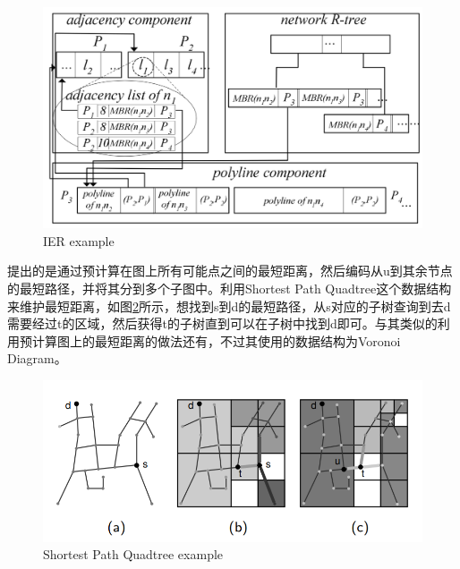 \documentclass{ML}
\begin{document}
\begin{figure}
	\centering
	\includegraphics[width=0.6\linewidth]{media/IER}
	\caption{IER example}
	\label{fig:ier}
\end{figure}

\cite{DisBrw}提出的是通过预计算在图上所有可能点之间的最短距离，然后编码从u到其余节点的最短路径，并将其分到多个子图中。利用Shortest Path Quadtree这个数据结构来维护最短距离，如图\ref{fig:disbrw}所示，想找到s到d的最短路径，从s对应的子树查询到去d需要经过t的区域，然后获得t的子树直到可以在子树中找到d即可。与其类似的利用预计算图上的最短距离的做法还有\cite{voronoi}，不过其使用的数据结构为Voronoi Diagram。
\begin{figure}
	\centering
	\includegraphics[width=0.7\linewidth]{media/DisBrw}
	\caption{Shortest Path Quadtree example}
	\label{fig:disbrw}
\end{figure}


\appendix
\end{document}
